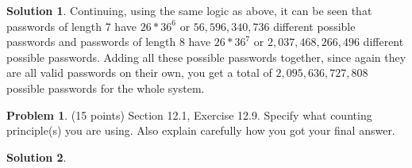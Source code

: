 \documentclass{article}
\theoremstyle{definition}
\newtheorem{problem}{Problem}
\newtheorem*{solution}{Solution}
\begin{document}
\begin{solution}
Continuing, using the same logic as above, it can be seen that passwords of length 7 have $26 * 36^6$ or $56,596,340,736$ different possible passwords and passwords of length 8 have $26* 36^7$ or $2,037,468,266,496$ different possible passwords. Adding all these possible passwords together, since again they are all valid passwords on their own, you get a total of $2,095,636,727,808$ possible passwords for the whole system.
\end{solution}

\newpage
\begin{problem} (15 points) Section 12.1, Exercise 12.9.  Specify what counting principle(s)
you are using.  Also explain carefully how you got your final answer.
\end{problem}
\begin{solution}
\hspace{1cm}

\end{solution}
\end{document}
